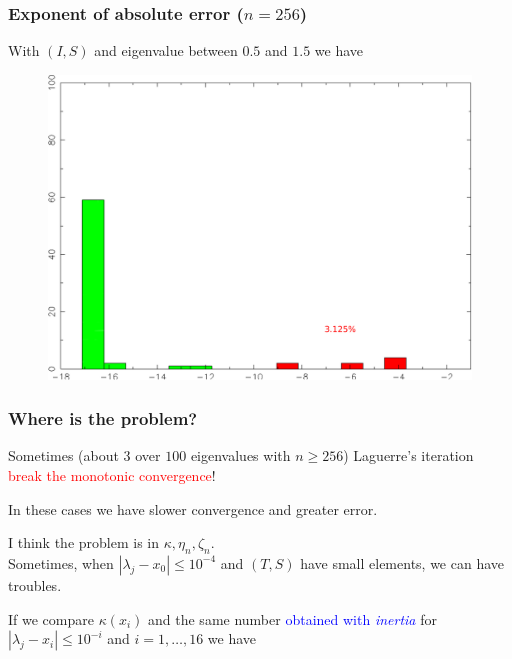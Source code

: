 \documentclass{beamer}
\theoremstyle{definition} \newtheorem{de}{Def}
\theoremstyle{remark} \newtheorem{os}[de]{Remark}
\theoremstyle{plain} \newtheorem{te}[de]{Teo}
\theoremstyle{plain} \newtheorem{co}[de]{Cor}
\theoremstyle{plain} \newtheorem{pr}[de]{Prop}
\theoremstyle{plain} \newtheorem{lem}[de]{Lemm}
\theoremstyle{remark} \newtheorem{rem}[de]{Remark}
\begin{document}
\begin{frame}
  \frametitle{Exponent of absolute error ($n=256$)}
  With $(I,S)$ and eigenvalue between $0.5$ and $1.5$ we have

  \begin{figure}
    \centering
    \includegraphics[scale=0.3]{images/IstogrammaEsponentiErrori_256.pdf}
  \end{figure}

\end{frame}


\begin{frame}
  \frametitle{Where is the problem?}

   Sometimes (about $3$ over $100$ eigenvalues with $n \ge 256$) Laguerre's iteration \textcolor{red}{break the monotonic convergence}! 

   \pause

   In these cases we have slower convergence and greater error.

   \pause

   I think the problem is in $\kappa,\eta_n,\zeta_n$. \\ Sometimes, when $|\lambda_j - x_0|\le 10^{-4}$ and $(T,S)$ have small elements, we can have troubles.

   \pause

   If we compare $\kappa(x_i)$ and the same number \textcolor{blue}{obtained with \emph{inertia}} for $|\lambda_j - x_i|\le 10^{-i}$ and $i=1,\dots,16$ we have
 
\end{frame}
\end{document}
